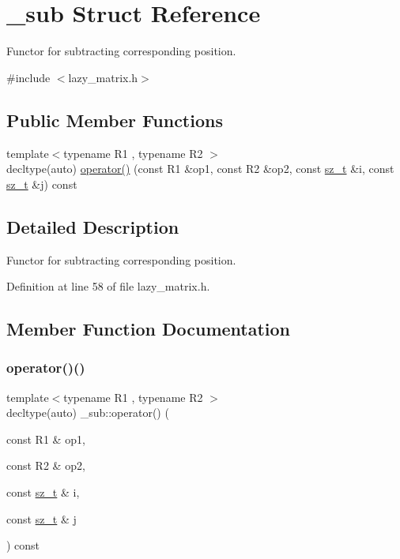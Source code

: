 \hypertarget{struct__sub}{}\section{\+\_\+sub Struct Reference}
\label{struct__sub}


Functor for subtracting corresponding position.  




{\ttfamily \#include $<$lazy\+\_\+matrix.\+h$>$}

\subsection*{Public Member Functions}
\begin{DoxyCompactItemize}
\item 
{\footnotesize template$<$typename R1 , typename R2 $>$ }\\decltype(auto) \mbox{\hyperlink{struct__sub_a00f3f76b692d99a7e29bd394029575a6}{operator()}} (const R1 \&op1, const R2 \&op2, const \mbox{\hyperlink{lazy__matrix_8h_acba2745dcfc55b2d05ff45adc6a0a015}{sz\+\_\+t}} \&i, const \mbox{\hyperlink{lazy__matrix_8h_acba2745dcfc55b2d05ff45adc6a0a015}{sz\+\_\+t}} \&j) const
\end{DoxyCompactItemize}


\subsection{Detailed Description}
Functor for subtracting corresponding position. 

Definition at line 58 of file lazy\+\_\+matrix.\+h.



\subsection{Member Function Documentation}
\mbox{\label{struct__sub_a00f3f76b692d99a7e29bd394029575a6}} 
\subsubsection{\texorpdfstring{operator()()}{operator()()}}
{\footnotesize\ttfamily template$<$typename R1 , typename R2 $>$ \\
decltype(auto) \+\_\+sub\+::operator() (\begin{DoxyParamCaption}\item[{const R1 \&}]{op1,  }\item[{const R2 \&}]{op2,  }\item[{const \mbox{\hyperlink{lazy__matrix_8h_acba2745dcfc55b2d05ff45adc6a0a015}{sz\+\_\+t}} \&}]{i,  }\item[{const \mbox{\hyperlink{lazy__matrix_8h_acba2745dcfc55b2d05ff45adc6a0a015}{sz\+\_\+t}} \&}]{j }\end{DoxyParamCaption}) const\hspace{0.3cm}{\ttfamily [inline]}}



